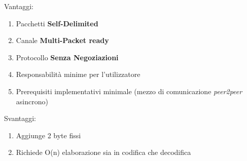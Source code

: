 \begin{multicols}{2}
	\begin{center}
		{\large Vantaggi:}
	\end{center}
	\begin{spacing}{1.25}
		\begin{enumerate}[itemsep=-1mm]
			\item Pacchetti \textbf{Self-Delimited}
			\item Canale \textbf{Multi-Packet ready}
			\item Protocollo \textbf{Senza Negoziazioni}
			\item Responsabilità minime per l'utilizzatore
			\item Prerequisiti implementativi minimale (mezzo di comunicazione \textit{peer2peer} asincrono)
		\end{enumerate}
	\end{spacing}
	\vfill
	\columnbreak
	\begin{center}
		{\large Svantaggi:}
	\end{center}
	\begin{spacing}{1.25}
		\begin{enumerate}[itemsep=-1mm]
			\item Aggiunge 2 byte fissi
			\item Richiede O(n) elaborazione sia in codifica che decodifica
		\end{enumerate}
	\end{spacing}
	\vspace*{\fill}
\end{multicols}
